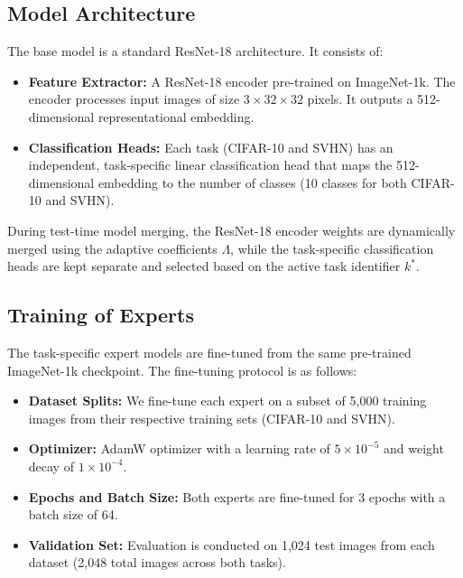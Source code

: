 \documentclass{article}
\theoremstyle{plain}
\theoremstyle{definition}
\theoremstyle{remark}
\begin{document}
\subsection{Model Architecture}
The base model is a standard ResNet-18 architecture. It consists of:
\begin{itemize}
    \item \textbf{Feature Extractor:} A ResNet-18 encoder pre-trained on ImageNet-1k. The encoder processes input images of size $3 \times 32 \times 32$ pixels. It outputs a 512-dimensional representational embedding.
    \item \textbf{Classification Heads:} Each task (CIFAR-10 and SVHN) has an independent, task-specific linear classification head that maps the 512-dimensional embedding to the number of classes (10 classes for both CIFAR-10 and SVHN).
\end{itemize}
During test-time model merging, the ResNet-18 encoder weights are dynamically merged using the adaptive coefficients $\Lambda$, while the task-specific classification heads are kept separate and selected based on the active task identifier $k^*$.

\subsection{Training of Experts}
The task-specific expert models are fine-tuned from the same pre-trained ImageNet-1k checkpoint. The fine-tuning protocol is as follows:
\begin{itemize}
    \item \textbf{Dataset Splits:} We fine-tune each expert on a subset of 5,000 training images from their respective training sets (CIFAR-10 and SVHN).
    \item \textbf{Optimizer:} AdamW optimizer with a learning rate of $5 \times 10^{-5}$ and weight decay of $1 \times 10^{-4}$.
    \item \textbf{Epochs and Batch Size:} Both experts are fine-tuned for 3 epochs with a batch size of 64.
    \item \textbf{Validation Set:} Evaluation is conducted on 1,024 test images from each dataset (2,048 total images across both tasks).
\end{itemize}
\end{document}
